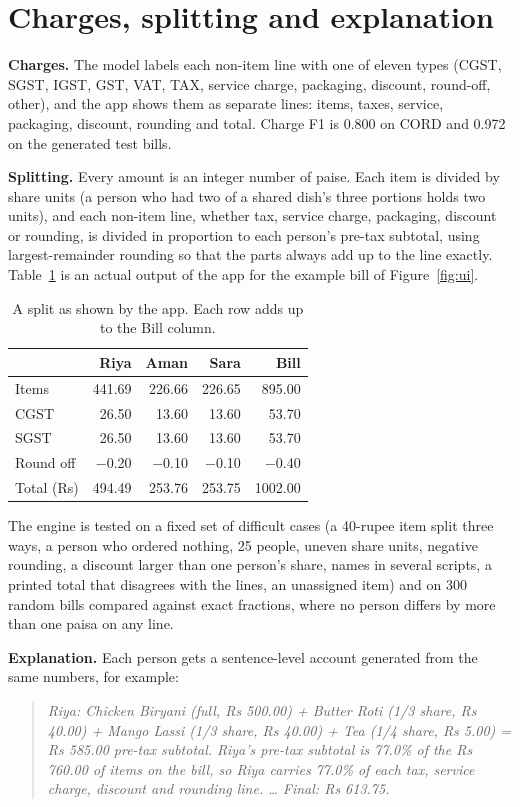 \documentclass[10pt,a4paper]{article}
\begin{document}
\section{Charges, splitting and explanation}\label{sec:charges}
\textbf{Charges.} The model labels each non-item line with one of eleven types (CGST, SGST, IGST, GST, VAT, TAX, service charge, packaging, discount, round-off, other), and the app shows them as separate lines: items, taxes, service, packaging, discount, rounding and total. Charge F1 is 0.800 on CORD and 0.972 on the generated test bills.

\textbf{Splitting.} Every amount is an integer number of paise. Each item is divided by share units (a person who had two of a shared dish's three portions holds two units), and each non-item line, whether tax, service charge, packaging, discount or rounding, is divided in proportion to each person's pre-tax subtotal, using largest-remainder rounding so that the parts always add up to the line exactly. Table~\ref{tab:split} is an actual output of the app for the example bill of Figure~\ref{fig:ui}.

\begin{table}[!ht]
\centering\small
\begin{tabular}{@{}lrrrr@{}}
\toprule
 & Riya & Aman & Sara & Bill\\
\midrule
Items & 441.69 & 226.66 & 226.65 & 895.00\\
CGST & 26.50 & 13.60 & 13.60 & 53.70\\
SGST & 26.50 & 13.60 & 13.60 & 53.70\\
Round off & $-$0.20 & $-$0.10 & $-$0.10 & $-$0.40\\
\midrule
Total (Rs) & 494.49 & 253.76 & 253.75 & 1002.00\\
\bottomrule
\end{tabular}
\caption{A split as shown by the app. Each row adds up to the Bill column.}\label{tab:split}
\end{table}

The engine is tested on a fixed set of difficult cases (a 40-rupee item split three ways, a person who ordered nothing, 25 people, uneven share units, negative rounding, a discount larger than one person's share, names in several scripts, a printed total that disagrees with the lines, an unassigned item) and on 300 random bills compared against exact fractions, where no person differs by more than one paisa on any line.

\textbf{Explanation.} Each person gets a sentence-level account generated from the same numbers, for example:
\begin{quote}\small\itshape
Riya: Chicken Biryani (full, Rs 500.00) + Butter Roti (1/3 share, Rs 40.00) + Mango Lassi (1/3 share, Rs 40.00) + Tea (1/4 share, Rs 5.00) = Rs 585.00 pre-tax subtotal. Riya's pre-tax subtotal is 77.0\% of the Rs 760.00 of items on the bill, so Riya carries 77.0\% of each tax, service charge, discount and rounding line. \ldots{} Final: Rs 613.75.
\end{quote}
\end{document}
